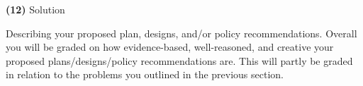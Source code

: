 \documentclass[11pt]{article}
\begin{document}
	\textbf{(12)} Solution 
	
	Describing your proposed plan, designs, and/or policy recommendations. Overall you will be graded on how evidence-based, well-reasoned, and creative your proposed plans/designs/policy recommendations are. This will partly be graded in relation to the problems you outlined in the previous section. 
	
	\vspace{5mm}
	
	
	
	
\end{document}

